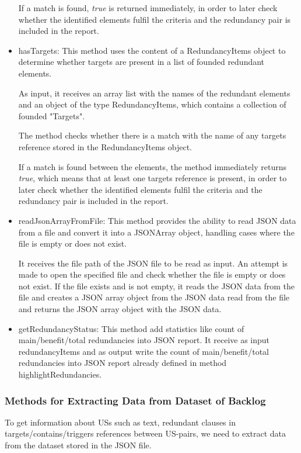 \begin{itemize}
	If a match is found, \textit{true} is returned immediately, in order to later check whether the identified elements fulfil the criteria and the redundancy pair is included in the report.
	
	\item hasTargets: This method uses the content of a RedundancyItems object to determine whether targets are present in a list of founded redundant elements.
	
	As input, it receives an array list with the names of the redundant elements and an object of the type RedundancyItems, which contains a collection of founded "Targets".
	
	The method checks whether there is a match with the name of any targets reference stored in the RedundancyItems object. 
	
	If a match is found between the elements, the method immediately returns \textit{true}, which means that at least one targets reference is present, in order to later check whether the identified elements fulfil the criteria and the redundancy pair is included in the report.
	
	\item readJsonArrayFromFile: This method provides the ability to read JSON data from a file and convert it into a JSONArray object, handling cases where the file is empty or does not exist.
	
	It receives the file path of the JSON file to be read as input. An attempt is made to open the specified file and check whether the file is empty or does not exist. If the file exists and is not empty, it reads the JSON data from the file and creates a JSON array object from the JSON data read from the file and returns the JSON array object with the JSON data.
	
	
	\item getRedundancyStatus: This method add statistics like count of main/benefit/total redundancies into JSON report. It receive as input redundancyItems and as output write the count of main/benefit/total redundancies into JSON report already defined in method highlightRedundancies.
\end{itemize}
\subsubsection*{Methods for Extracting Data from Dataset of Backlog}
To get information about USs such as text, redundant clauses in targets/contains/triggers references between US-pairs, we need to extract data from the dataset stored in the JSON file.

